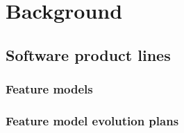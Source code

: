 \chapter{Background} 

\section{Software product lines}
\subsection{Feature models}
\subsection{Feature model evolution plans}
